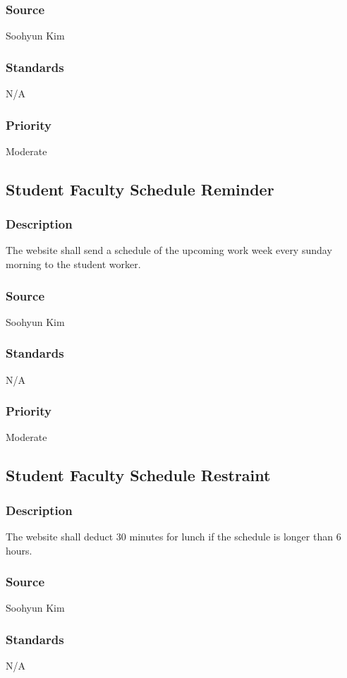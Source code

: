 \subsubsection{Source}
Soohyun Kim
\subsubsection{Standards}
N/A
\subsubsection{Priority}
Moderate

\subsection{Student Faculty Schedule Reminder}
\subsubsection{Description}
The website shall send a schedule of the upcoming work week every sunday morning to the student worker.
\subsubsection{Source}
Soohyun Kim
\subsubsection{Standards}
N/A
\subsubsection{Priority}
Moderate

\subsection{Student Faculty Schedule Restraint}
\subsubsection{Description}
The website shall deduct 30 minutes for lunch if the schedule is longer than 6 hours.
\subsubsection{Source}
Soohyun Kim
\subsubsection{Standards}
N/A
